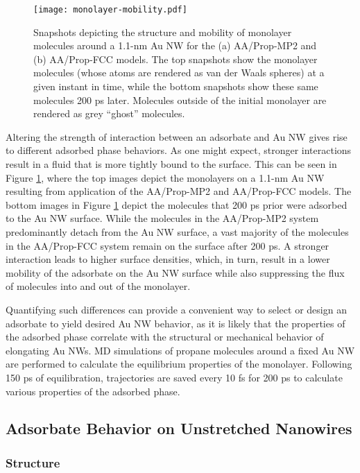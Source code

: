 \documentclass[10pt]{report}  %
\newcommand\findent{\hspace*{\parindent}}
\begin{document}
%
%
\begin{figure}[b!]
	\centering
	\texttt{[image: monolayer-mobility.pdf]}
	\caption{Snapshots depicting the structure and mobility of monolayer molecules around a 1.1-nm Au NW for the (a) AA/Prop-MP2 and (b) AA/Prop-FCC models.  The top snapshots show the monolayer molecules (whose atoms are rendered as van der Waals spheres) at a given instant in time, while the bottom snapshots show these same molecules 200 ps later.  Molecules outside of the initial monolayer are rendered as grey ``ghost'' molecules. }
	\label{fig:monolayer-mobility}
\end{figure}

\findent Altering the strength of interaction between an adsorbate and Au NW gives rise to different adsorbed phase behaviors.  As one might expect, stronger interactions result in a fluid that is more tightly bound to the surface.  This can be seen in Figure \ref{fig:monolayer-mobility}, where the top images depict the monolayers on a 1.1-nm Au NW resulting from application of the AA/Prop-MP2 and AA/Prop-FCC models.  The bottom images in Figure \ref{fig:monolayer-mobility} depict the molecules that 200 ps prior were adsorbed to the Au NW surface.  While the molecules in the AA/Prop-MP2 system predominantly detach from the Au NW surface, a vast majority of the molecules in the AA/Prop-FCC system remain on the surface after 200 ps.  A stronger interaction leads to higher surface densities, which, in turn, result in a lower mobility of the adsorbate on the Au NW surface while also suppressing the flux of molecules into and out of the monolayer.

Quantifying such differences can provide a convenient way to select or design an adsorbate to yield desired Au NW behavior, as it is likely that the properties of the adsorbed phase correlate with the structural or mechanical behavior of elongating Au NWs.  MD simulations of propane molecules around a fixed Au NW are performed to calculate the equilibrium properties of the monolayer.  Following 150 ps of equilibration, trajectories are saved every 10 fs for 200 ps to calculate various properties of the adsorbed phase.

\subsection{Adsorbate Behavior on Unstretched Nanowires}

\subsubsection{Structure}
\end{document}
